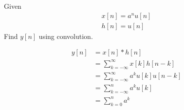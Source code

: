 \documentclass[fleqn, a4paper, 11pt, oneside]{amsart}
\theoremstyle{definition}
\theoremstyle{theorem}
\begin{document}
\begin{question}
	Given
	\begin{align*}
		x[n] = a^n u[n] \\
		h[n] = u[n]
	\end{align*}
	Find $y[n]$ using convolution.
\end{question}

\begin{solution}
	\begin{align*}
		y[n] & = x[n] \ast h[n]                                       \\
                     & = \sum\limits_{k = -\infty}^{\infty} x[k] h[n - k]     \\
                     & = \sum\limits_{k = -\infty}^{\infty} a^k u[k] u[n - k] \\
                     & = \sum\limits_{k = -\infty}^{n} a^k u[k]               \\
                     & = \sum\limits_{k = 0}^{n} a^k                          \\
	\end{align*}
\end{solution}
\end{document}
